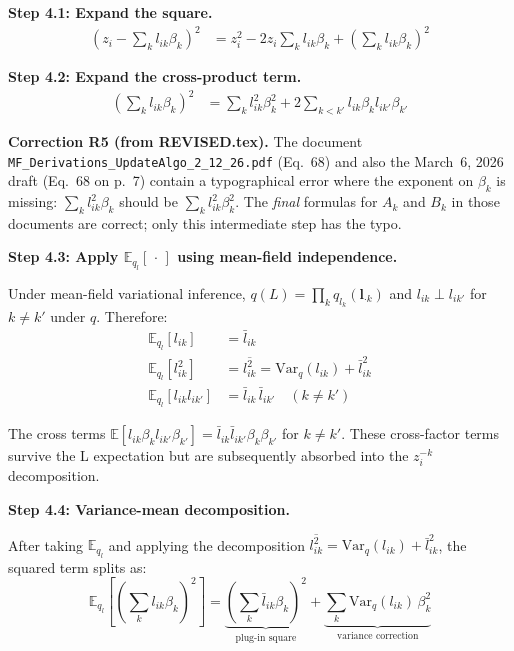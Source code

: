 \documentclass[11pt]{article}
\begin{document}
\begin{derivbox}
\textbf{Step 4.1: Expand the square.}
\begin{align}
  \left(z_i - \sum_k l_{ik}\beta_k\right)^{\!2}
  &= z_i^2 - 2z_i\sum_k l_{ik}\beta_k + \left(\sum_k l_{ik}\beta_k\right)^{\!2}
  \label{eq:expand-sq}
\end{align}

\textbf{Step 4.2: Expand the cross-product term.}
\begin{align}
  \left(\sum_k l_{ik}\beta_k\right)^{\!2}
  &= \sum_k l_{ik}^2\beta_k^2 + 2\sum_{k < k'} l_{ik}\beta_k l_{ik'}\beta_{k'}
  \label{eq:expand-cross}
\end{align}

\begin{correctionbox}
\textbf{Correction R5 (from REVISED.tex).} The document
\texttt{MF\_Derivations\_UpdateAlgo\_2\_12\_26.pdf} (Eq.~68) and also the
March~6, 2026 draft (Eq.~68 on p.~7) contain a typographical error where
the exponent on $\beta_k$ is missing: $\sum_k l^2_{ik}\beta_k$ should be
$\sum_k l^2_{ik}\beta^2_k$.  The \emph{final} formulas for $A_k$ and $B_k$
in those documents are correct; only this intermediate step has the typo.
\end{correctionbox}

\textbf{Step 4.3: Apply $\mathbb{E}_{q_l}[\,\cdot\,]$ using mean-field independence.}

Under mean-field variational inference, $q(L) = \prod_k q_{l_k}(\bm{l}_{\cdot k})$
and $l_{ik} \perp l_{ik'}$ for $k \neq k'$ under $q$.  Therefore:
\begin{align*}
  \mathbb{E}_{q_l}[l_{ik}] &= \bar{l}_{ik} \\
  \mathbb{E}_{q_l}[l_{ik}^2] &= \overline{l^2_{ik}} = \mathrm{Var}_q(l_{ik}) + \bar{l}_{ik}^2 \\
  \mathbb{E}_{q_l}[l_{ik} l_{ik'}] &= \bar{l}_{ik}\,\bar{l}_{ik'} \quad (k \neq k')
\end{align*}

The cross terms $\mathbb{E}[l_{ik}\beta_k l_{ik'}\beta_{k'}] = \bar{l}_{ik}\bar{l}_{ik'}\beta_k\beta_{k'}$
for $k \neq k'$.  These cross-factor terms survive the L expectation but are
subsequently absorbed into the $z_i^{-k}$ decomposition.

\textbf{Step 4.4: Variance-mean decomposition.}

After taking $\mathbb{E}_{q_l}$ and applying the decomposition
$\overline{l^2_{ik}} = \mathrm{Var}_q(l_{ik}) + \bar{l}_{ik}^2$, the
squared term splits as:
\begin{equation}
  \mathbb{E}_{q_l}\!\left[\left(\sum_k l_{ik}\beta_k\right)^{\!2}\right]
  = \underbrace{\left(\sum_k \bar{l}_{ik}\beta_k\right)^{\!2}}_{\text{plug-in square}}
  + \underbrace{\sum_k \mathrm{Var}_q(l_{ik})\,\beta_k^2}_{\text{variance correction}}
  \label{eq:variance-split}
\end{equation}


\end{derivbox}
\end{document}
